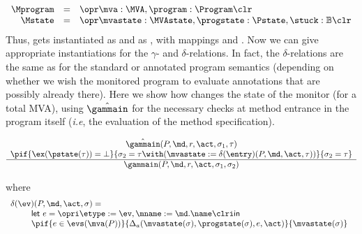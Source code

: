 \[ 
\begin{array}{rcl}
\Mprogram & =  & \opr \mva : \MVA, \program : \Program \clr\\
\Mstate & = & \opr \mvastate : \MVAstate, \progstate : \Pstate, \stuck
: \mathbb{B} \clr
\end{array}
\]
Thus, \FullProgram gets instantiated as \Mprogram and \FullState as
\Mstate, with mappings \program and \progstate. Now we can give
appropriate instantiations for the \(\gamma\)- and
\(\delta\)-relations. In fact, the \(\delta\)-relations are the same as
for the standard or annotated program semantics (depending on whether
we wish the monitored program to evaluate annotations that are
possibly already there). Here we show how \gammain changes the state
of the monitor (for a total MVA), using \(\hat\gammain\) for the
necessary checks at method entrance in the program itself (\emph{i.e},
the evaluation of the method specification).

\[
\begin{array}{c}
\hat\gammain(P, \md, r, \act, \sigma_1, \tau) \\
\pif{\ex(\pstate(\tau)) = \bot}
    {\sigma_2 = \tau \with (\mvastate := \delta(\entry)(P, \md, \act, \tau))}
    {\sigma_2 = \tau}\\
\hline
\gammain(P, \md, r, \act, \sigma_1, \sigma_2)
\end{array}
\]

\noindent where
\[
\begin{array}{l}
\delta(\ev)(P, \md, \act, \sigma) =\\
\qquad
\begin{array}[t]{l}
\mathsf{let\ } e = \opri \etype := \ev, \mname := \md.\name \clri
\mathsf{in\ }\\
\pif{e \in \evs(\mva(P))}{\Delta_a(\mvastate(\sigma),
\progstate(\sigma), e, \act)}{\mvastate(\sigma)}
\end{array}
\end{array}
\]




